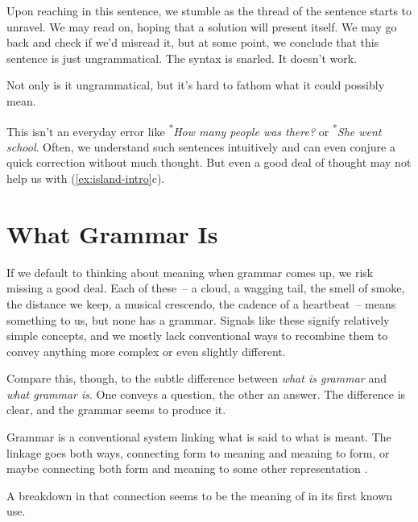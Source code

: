 \ea
\label{ex:island-intro}
\z\z

Upon reaching  in this sentence, we stumble as the thread
of the sentence starts to unravel. We may read on, hoping that a solution
will present itself. We may go back and check if we'd misread it, but at
some point, we conclude that this sentence is just ungrammatical. The
syntax is snarled. It doesn't work.

Not only is it ungrammatical, but it's hard to fathom what it could
possibly mean.

This isn't an everyday error like \textsuperscript{*}\textit{How many people was there?} or \textsuperscript{*}\textit{She went school}. Often, we understand such sentences intuitively and can even conjure a quick correction without much thought. But even a good deal of thought may not help us with (\ref{ex:island-intro}c).

\section{What Grammar Is}

If we default to thinking about meaning when grammar comes up, we risk missing a good deal. Each of these~-- a cloud, a wagging tail, the smell of smoke, the distance we keep, a musical crescendo, the cadence of a heartbeat~-- means something to us, but none has a grammar. Signals like these signify relatively simple concepts, and we mostly lack conventional ways to recombine them to convey anything more complex or even slightly different.

Compare this, though, to the subtle difference between \textit{what is grammar} and \textit{what grammar is}. One conveys a question, the other an answer. The difference is clear, and the grammar seems to produce it.

Grammar is a conventional system linking what is said to what is meant.
The linkage goes both ways, connecting form to meaning and meaning to
form, or maybe connecting both form and meaning to some other
representation \citep[371]{Futrell2020}.

A breakdown in that connection seems to be the meaning of  in its first known use.

